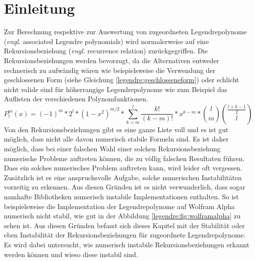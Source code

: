 %
%
%
\section{Einleitung\label{legendre:section:einleitung}}
Zur Berechnung respektive zur Auswertung von zugeordneten Legendrepolynome (\textit{engl.} associated Legendre polynomials) wird normalerweise auf eine Rekursionsbeziehung (\textit{engl.} recurrence relation) zurückgegriffen.
Die Rekursionsbeziehungen werden bevorzugt, da die Alternativen entweder rechnerisch zu aufwändig wären wie beispielsweise die Verwendung der geschlossenen Form (siehe Gleichung \eqref{legendre:geschlosseneform}) oder schlicht nicht valide sind für höherrangige Legendrepolynome wie zum Beispiel das Auflisten der verschiedenen Polynomfunktionen.
\begin{equation}
P^{m}_{l}(x)
=
(-1)^m*2^l*(1-x^2)^{m/2}
* \sum_{k=m}^{l} \frac{k!}{(k-m)!}*x^{k-m}
* \binom{l}{m} \binom{\frac{l+k-1}{2}}{l}
\label{legendre:geschlosseneform}
\end{equation}
Von den Rekursionsbeziehungen gibt es eine ganze Liste voll und es ist gut möglich, dass nicht alle davon numerisch stabile Formeln sind.
Es ist daher möglich, dass bei einer falschen Wahl einer solchen Rekursionsbeziehung numerische Probleme auftreten können, die zu völlig falschen Resultaten führen.
Dass ein solches numerisches Problem auftreten kann, wird leider oft vergessen.
Zusätzlich ist es eine anspruchsvolle Aufgabe, solche numerischen Instabilitäten vorzeitig zu erkennen.
Aus diesen Gründen ist es nicht verwunderlich, dass sogar namhafte Bibliotheken numerisch instabile Implementationen enthalten.
So ist beispielsweise die Implementation der Legendrepolynome auf Wolfram Alpha \cite{legendre:wolfram-alpha} numerisch nicht stabil, wie gut in der Abbildung \ref{legendre:fig:wolframalpha} zu sehen ist.
Aus diesen Gründen befasst sich dieses Kapitel mit der Stabilität oder eben Instabilität der Rekursionsbeziehungen für zugeordnete Legendrepolynome.
Es wird dabei untersucht, wie numerisch instabile Rekursionsbeziehungen erkannt werden können und wieso diese instabil sind.

